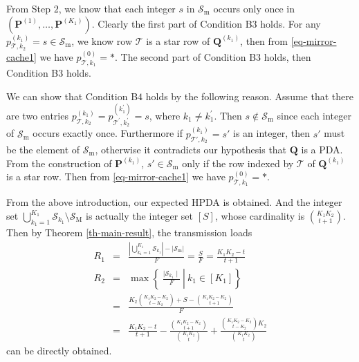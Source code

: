 \documentclass[onecolumn,10pt]{IEEEtran}
\theoremstyle{mythm}
\begin{document}
{From Step $2$, we know that each integer $s$ in $\mathcal{S}_{\text{m}}$ occurs only once in $(\mathbf{P}^{(1)},\ldots,\mathbf{P}^{(K_1)})$. Clearly the first part of Condition B$3$ holds. For any $p^{(k_1)}_{\mathcal{T},k_2}=s\in\mathcal{S}_{\text{m}}$, we know row $\mathcal{T}$ is a star row of $\mathbf{Q}^{(k_1)}$, then from \eqref{eq-mirror-cache1} we have $p^{(0)}_{\mathcal{T},k_1}=*$. The second part of  Condition B$3$ holds, then Condition B$3$ holds.

We can show that Condition B$4$ holds by the following reason. Assume that there are two entries $p^{(k_1)}_{\mathcal{T},k_2}=p^{(k^{'}_1)}_{\mathcal{T}^{'},k^{'}_2}=s$, where $k_1\neq k^{'}_1$. Then $s\not\in \mathcal{S}_{\text{m}}$ since each integer of $\mathcal{S}_{\text{m}}$ occurs exactly once. Furthermore if $p^{(k_1)}_{\mathcal{T'},k_2}=s'$ is an integer, then $s'$ must be the element of $\mathcal{S}_{\text{m}}$, otherwise it  contradicts our hypothesis that $\mathbf{Q}$ is a PDA. From the construction of $\mathbf{P}^{(k_1)}$, $s'\in \mathcal{S}_{\text{m}}$ only if the row indexed by $\mathcal{T}$ of $\mathbf{Q}^{(k_1)}$ is a star row. Then from \eqref{eq-mirror-cache1} we have $p^{(0)}_{\mathcal{T},k_1}=*$.

From the above introduction, our expected HPDA is obtained. And the integer set $\bigcup_{k_1=1}^{K_1}\mathcal{S}_{k_1}\setminus\mathcal{S}_{\text{M}}$ is actually the integer set $[S]$, whose cardinality is ${K_1K_2\choose t+1}$. Then by Theorem \ref{th-main-result}, the transmission loads
\begin{eqnarray*}
R_1&=&\frac{|\bigcup_{k_1=1}^{K_1}\mathcal{S}_{k_1}|-|\mathcal{S}_\text{m}|}{F}
=\frac{S}{F}=\frac{K_1K_2-t}{t+1}\\
R_2&=&\max\left.\left\{\  \frac{\mid\mathcal{S}_{k_1}\mid}{F}\ \right| \ k_1\in[K_1] \right\}\\
&=&\frac{K_2{K_1K_2-K_2\choose t-K_2}+S-{K_1K_2-K_2\choose t+1}}{F}\\
&=&\frac{K_1K_2-t}{t+1}-\frac{{K_1K_2-K_2\choose t+1}}{{K_1K_2\choose t}}+\frac{{K_1K_2-K_2\choose t-K_2}K_2}{{K_1K_2\choose t}}
\end{eqnarray*} can be directly obtained.

}
\end{document}
